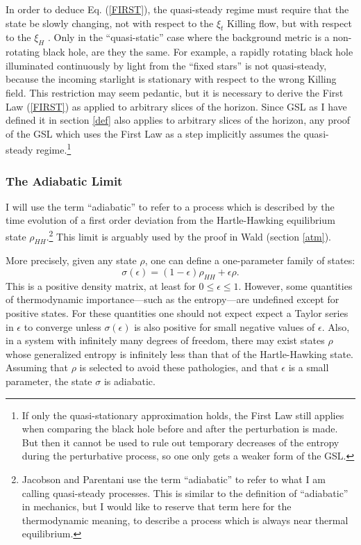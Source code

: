 \documentclass{article}
\begin{document}
In order to deduce Eq. (\ref{FIRST}), the quasi-steady regime must require that the state be slowly changing, not with respect to the $\xi_t$ Killing flow, but with respect to the $\xi_H$ \cite{JP03}.  Only in the ``quasi-static'' case where the background metric is a non-rotating black hole, are they the same.  For example, a rapidly rotating black hole illuminated continuously by light from the ``fixed stars'' is not quasi-steady, because the incoming starlight is stationary with respect to the wrong Killing field.  This restriction may seem pedantic, but it is necessary to derive the First Law (\ref{FIRST}) as applied to arbitrary slices of the horizon.  Since GSL as I have defined it in section \ref{def} also applies to arbitrary slices of the horizon, any proof of the GSL which uses the First Law as a step implicitly assumes the quasi-steady regime.\footnote{If only the quasi-stationary approximation holds, the First Law still applies when comparing the black hole before and after the perturbation is made.  But then it cannot be used to rule out temporary decreases of the entropy during the perturbative process, so one only gets a weaker form of the GSL.}

\subsubsection{The Adiabatic Limit}\label{adiabatic}

I will use the term ``adiabatic'' to refer to a process which is described by the time 
evolution of a first order deviation from the Hartle-Hawking equilibrium state $\rho_{HH}$.\footnote{Jacobson and Parentani \cite{JP03} use the term ``adiabatic'' to refer to what I am calling quasi-steady processes.  This is similar to the definition of ``adiabatic'' in mechanics, but I would like to reserve that term here for the thermodynamic meaning, to describe a process which is always near thermal equilibrium.}  This limit is arguably used by the proof in Wald \cite{wald94} (section \ref{atm}).

More precisely, given any state $\rho$, one can define a one-parameter family of states:
\begin{equation}
\sigma(\epsilon) = (1 - \epsilon) \rho_{HH} + \epsilon \rho.
\end{equation}
This is a positive density matrix, at least for $0 \le \epsilon \le 1$.  However, some quantities of thermodynamic importance---such as the entropy---are undefined except for positive states.  For these quantities one should not expect expect a Taylor series in $\epsilon$ to converge unless $\sigma(\epsilon)$ is also positive for small negative values of $\epsilon$.  Also, in a system with infinitely many degrees of freedom, there may exist states $\rho$ whose generalized entropy is infinitely less than that of the Hartle-Hawking state.  Assuming that $\rho$ is selected to avoid these pathologies, and that $\epsilon$ is a small parameter, the state $\sigma$ is adiabatic.
\end{document}
